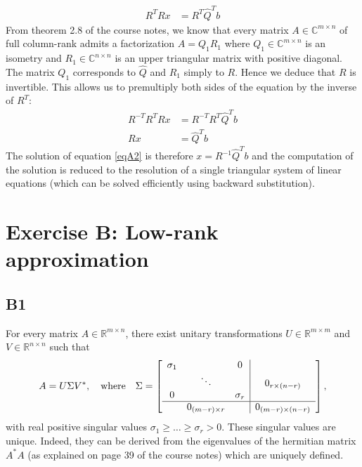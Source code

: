 \documentclass[11pt]{article}
\newcommand{\real}{\mathbb{R}} %
\newcommand{\complex}{\mathbb{C}} %
\newcommand{\snorm}[1]{\norm{#1}_2} %
\begin{document}
\begin{align*}
    R^TRx &= R^T\hat{Q}^Tb
\end{align*}
From theorem 2.8 of the course notes, we know that every matrix $A\in\complex^{m\times n}$ of full column-rank admits a factorization $A=Q_1R_1$ where $Q_1\in\complex^{m\times n}$ is an isometry and $R_1\in\complex^{n\times n}$ is an upper triangular matrix with positive diagonal. The matrix $Q_1$ corresponds to $\hat{Q}$ and $R_1$ simply to $R$. Hence we deduce that $R$ is invertible. This allows us to premultiply both sides of the equation by the inverse of $R^T$:
\begin{align*}
    R^{-T}R^TRx &= R^{-T}R^T\hat{Q}^Tb\\
    Rx &= \hat{Q}^Tb
\end{align*}
The solution of equation \eqref{eqA2} is therefore $x=R^{-1}\hat{Q}^Tb$ and the computation of the solution is reduced to the resolution of a single triangular system of linear equations (which can be solved efficiently using backward substitution).


\section*{Exercise B: Low-rank approximation}
\subsection*{B1}
For every matrix \(A \in \real^{m \times n}\), there exist unitary transformations \(U \in \real^{m \times m}\) and \(V \in \real^{n \times n}\) such that
\[
A = U \Sigma V^*, \quad \textnormal{where}\quad \Sigma = \left[\begin{array}{ccc|c}
\sigma_1 & & 0 & \\
& \ddots & & 0_{r \times (n-r)}\\
0 && \sigma_r & \\
\hline
& 0_{(m-r) \times r} & & 0_{(m-r) \times (n-r)}
\end{array}\right],
\]
with real positive singular values \(\sigma_1 \geqslant \dots \geqslant \sigma_r > 0\).
These singular values are unique. Indeed, they can be derived from the eigenvalues of the hermitian matrix $A^*A$ (as explained on page 39 of the course notes) which are uniquely defined.
\end{document}

